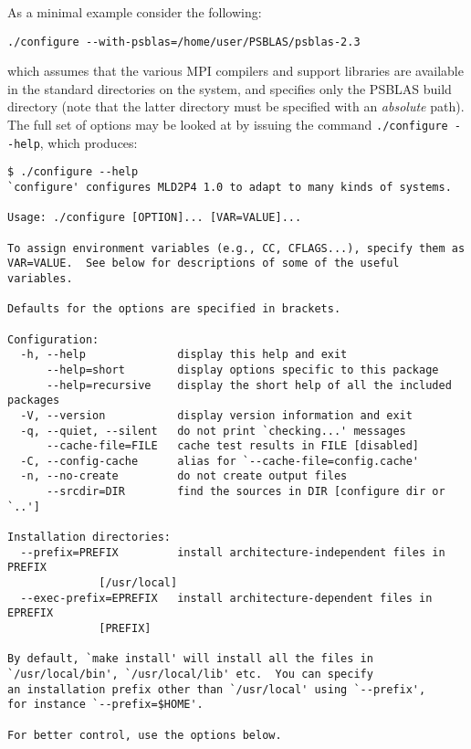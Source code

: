 As a minimal example consider the following:
\begin{verbatim}
./configure --with-psblas=/home/user/PSBLAS/psblas-2.3
\end{verbatim}
which assumes that the various MPI compilers and support libraries are
available in the standard directories on the system, and specifies
only the PSBLAS build directory (note that the latter directory must
be specified with an {\em absolute} path).
The full set of options may be looked at by issuing the command
\verb|./configure --help|, which produces:
\begin{verbatim}
$ ./configure --help
`configure' configures MLD2P4 1.0 to adapt to many kinds of systems.

Usage: ./configure [OPTION]... [VAR=VALUE]...

To assign environment variables (e.g., CC, CFLAGS...), specify them as
VAR=VALUE.  See below for descriptions of some of the useful variables.

Defaults for the options are specified in brackets.

Configuration:
  -h, --help              display this help and exit
      --help=short        display options specific to this package
      --help=recursive    display the short help of all the included packages
  -V, --version           display version information and exit
  -q, --quiet, --silent   do not print `checking...' messages
      --cache-file=FILE   cache test results in FILE [disabled]
  -C, --config-cache      alias for `--cache-file=config.cache'
  -n, --no-create         do not create output files
      --srcdir=DIR        find the sources in DIR [configure dir or `..']

Installation directories:
  --prefix=PREFIX         install architecture-independent files in PREFIX
			  [/usr/local]
  --exec-prefix=EPREFIX   install architecture-dependent files in EPREFIX
			  [PREFIX]

By default, `make install' will install all the files in
`/usr/local/bin', `/usr/local/lib' etc.  You can specify
an installation prefix other than `/usr/local' using `--prefix',
for instance `--prefix=$HOME'.

For better control, use the options below.


\end{verbatim}
